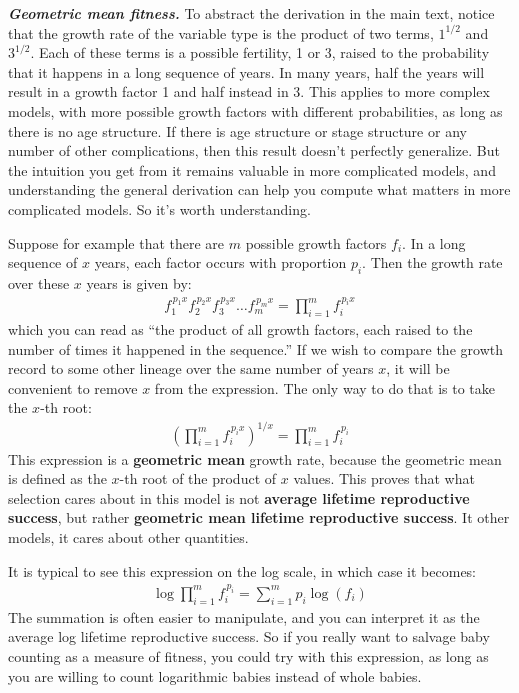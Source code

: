 \documentclass[10pt,reqno]{amsbook}
\newcommand{\bemph}[1]{{\textbf{\textcolor{bemphcol}{#1}}}}
\numberwithin{equation}{chapter}
\newenvironment{mathboxmp}[1]
{\begin{tcolorbox}[breakable, enhanced, oversize]\footnotesize\noindent\textbf{\emph{#1}}}
{\end{tcolorbox}}
\begin{document}
\begin{mathboxmp}{Geometric mean fitness.} 
To abstract the derivation in the main text, notice that the growth rate of the variable type is the product of two terms, $1^{\!1/2}$ and $3^{\!1/2}$. Each of these terms is a possible fertility, 1 or 3, raised to the probability that it happens in a long sequence of years. In many years, half the years will result in a growth factor 1 and half instead in 3. This applies to more complex models, with more possible growth factors with different probabilities, as long as there is no age structure. If there is age structure or stage structure or any number of other complications, then this result doesn't perfectly generalize. But the intuition you get from it remains valuable in more complicated models, and understanding the general derivation can help you compute what matters in more complicated models. So it's worth understanding.

Suppose for example that there are $m$ possible growth factors $f_i$. In a long sequence of $x$ years, each factor occurs with proportion $p_i$. Then the growth rate over these $x$ years is given by:
\begin{align*}
	 f_1^{\,p_1 x} f_2^{\,p_2 x} f_3^{\,p_3 x} \hdots f_m^{\,p_m x}  =  \prod_{i=1}^m f_i^{\,p_i x} 
\end{align*}
which you can read as ``the product of all growth factors, each raised to the number of times it happened in the sequence.'' If we wish to compare the growth record to some other lineage over the same number of years $x$, it will be convenient to remove $x$ from the expression. The only way to do that is to take the $x$-th root:
\begin{align*}
	 \left( \prod_{i=1}^m f_i^{\,p_i x} \right)^{\!\!1/x} = \prod_{i=1}^m f_i^{\,p_i }
\end{align*}
This expression is a \bemph{geometric mean} growth rate, because the geometric mean is defined as the $x$-th root of the product of $x$ values. This proves that what selection cares about in this model is not \bemph{average lifetime reproductive success}, but rather \bemph{geometric mean lifetime reproductive success}. It other models, it cares about other quantities.

It is typical to see this expression on the log scale, in which case it becomes:
\begin{align*}
	\log \prod_{i=1}^m f_i^{\,p_i} = \sum_{i=1}^m p_i \log(f_i)
\end{align*}
The summation is often easier to manipulate, and you can interpret it as the average log lifetime reproductive success. So if you really want to salvage baby counting as a measure of fitness, you could try with this expression, as long as you are willing to count logarithmic babies instead of whole babies.


\end{mathboxmp}
\end{document}
